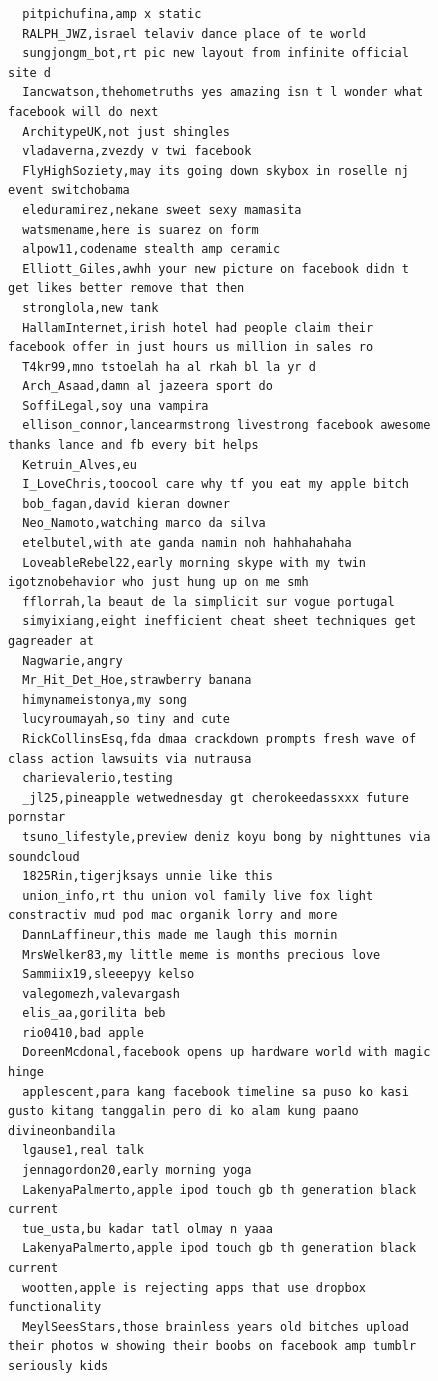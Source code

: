\begin{figure}[htpb]
\begin{verbatim}
  pitpichufina,amp x static
  RALPH_JWZ,israel telaviv dance place of te world
  sungjongm_bot,rt pic new layout from infinite official site d
  Iancwatson,thehometruths yes amazing isn t l wonder what facebook will do next
  ArchitypeUK,not just shingles
  vladaverna,zvezdy v twi facebook
  FlyHighSoziety,may its going down skybox in roselle nj event switchobama
  eleduramirez,nekane sweet sexy mamasita
  watsmename,here is suarez on form
  alpow11,codename stealth amp ceramic
  Elliott_Giles,awhh your new picture on facebook didn t get likes better remove that then
  stronglola,new tank
  HallamInternet,irish hotel had people claim their facebook offer in just hours us million in sales ro
  T4kr99,mno tstoelah ha al rkah bl la yr d
  Arch_Asaad,damn al jazeera sport do
  SoffiLegal,soy una vampira
  ellison_connor,lancearmstrong livestrong facebook awesome thanks lance and fb every bit helps
  Ketruin_Alves,eu
  I_LoveChris,toocool care why tf you eat my apple bitch
  bob_fagan,david kieran downer
  Neo_Namoto,watching marco da silva
  etelbutel,with ate ganda namin noh hahhahahaha
  LoveableRebel22,early morning skype with my twin igotznobehavior who just hung up on me smh
  fflorrah,la beaut de la simplicit sur vogue portugal
  simyixiang,eight inefficient cheat sheet techniques get gagreader at
  Nagwarie,angry
  Mr_Hit_Det_Hoe,strawberry banana
  himynameistonya,my song
  lucyroumayah,so tiny and cute
  RickCollinsEsq,fda dmaa crackdown prompts fresh wave of class action lawsuits via nutrausa
  charievalerio,testing
  _jl25,pineapple wetwednesday gt cherokeedassxxx future pornstar
  tsuno_lifestyle,preview deniz koyu bong by nighttunes via soundcloud
  1825Rin,tigerjksays unnie like this
  union_info,rt thu union vol family live fox light constractiv mud pod mac organik lorry and more
  DannLaffineur,this made me laugh this mornin
  MrsWelker83,my little meme is months precious love
  Sammiix19,sleeepyy kelso
  valegomezh,valevargash
  elis_aa,gorilita beb
  rio0410,bad apple
  DoreenMcdonal,facebook opens up hardware world with magic hinge
  applescent,para kang facebook timeline sa puso ko kasi gusto kitang tanggalin pero di ko alam kung paano divineonbandila
  lgause1,real talk
  jennagordon20,early morning yoga
  LakenyaPalmerto,apple ipod touch gb th generation black current
  tue_usta,bu kadar tatl olmay n yaaa
  LakenyaPalmerto,apple ipod touch gb th generation black current
  wootten,apple is rejecting apps that use dropbox functionality
  MeylSeesStars,those brainless years old bitches upload their photos w showing their boobs on facebook amp tumblr seriously kids

\end{verbatim}
\end{figure}
